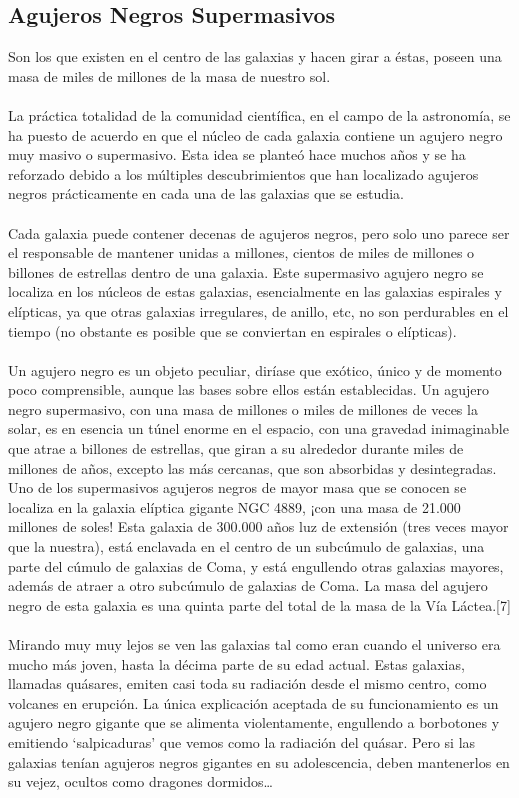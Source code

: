 \documentclass[12pt]{article}
\begin{document}
\subsection{Agujeros Negros Supermasivos}
Son los que existen en el centro de las galaxias y hacen girar a éstas, poseen una masa de miles de millones de la masa de nuestro sol.\\\\
La práctica totalidad de la comunidad científica, en el campo de la astronomía, se ha puesto de acuerdo en que el núcleo de cada galaxia contiene un agujero negro muy masivo o supermasivo. Esta idea se planteó hace muchos años y se ha reforzado debido a los múltiples descubrimientos que han localizado agujeros negros prácticamente en cada una de las galaxias que se estudia.\\\\
Cada galaxia puede contener decenas de agujeros negros, pero solo uno parece ser el responsable de mantener unidas a millones, cientos de miles de millones o billones de estrellas dentro de una galaxia. Este supermasivo agujero negro se localiza en los núcleos de estas galaxias, esencialmente en las galaxias espirales y elípticas, ya que otras galaxias irregulares, de anillo, etc, no son perdurables en el tiempo (no obstante es posible que se conviertan en espirales o elípticas).\\\\
Un agujero negro es un objeto peculiar, diríase que exótico, único y de momento poco comprensible, aunque las bases sobre ellos están establecidas. Un agujero negro supermasivo, con una masa de millones o miles de millones de veces la solar, es en esencia un túnel enorme en el espacio, con una gravedad inimaginable que atrae a billones de estrellas, que giran a su alrededor durante miles de millones de años, excepto las más cercanas, que son absorbidas y desintegradas.
Uno de los supermasivos agujeros negros de mayor masa que se conocen se localiza en la galaxia elíptica gigante NGC 4889, ¡con una masa de 21.000 millones de soles! Esta galaxia de 300.000 años luz de extensión (tres veces mayor que la nuestra), está enclavada en el centro de un subcúmulo de galaxias, una parte del cúmulo de galaxias de Coma, y está engullendo otras galaxias mayores, además de atraer a otro subcúmulo de galaxias de Coma. La masa del agujero negro de esta galaxia es una quinta parte del total de la masa de la Vía Láctea.[7]
\\\\%
Mirando muy muy lejos se ven las galaxias tal como eran cuando el universo era mucho más joven, hasta la décima parte de su edad actual. Estas galaxias, llamadas quásares, emiten casi toda su radiación desde el mismo centro, como volcanes en erupción. La única explicación aceptada de su funcionamiento es un agujero negro gigante que se alimenta violentamente, engullendo a borbotones y emitiendo ‘salpicaduras’ que vemos como la radiación del quásar. Pero si las galaxias tenían agujeros negros gigantes en su adolescencia, deben mantenerlos en su vejez, ocultos como dragones dormidos…
\end{document}
